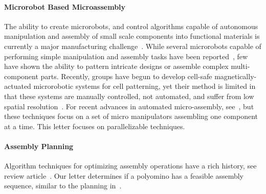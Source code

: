 \paragraph{Microrobot Based Microassembly}
The ability to create microrobots, and control algorithms capable of autonomous manipulation and assembly of small scale components into functional materials is currently a major manufacturing challenge~\cite{chang2005therapeutic}. 
While several microrobots capable of performing simple manipulation and assembly tasks have been reported~\cite{prakash2007artificial,chang2007artificial,weibel2007microfabrication,abbott2007robotics,yi2006microfluidics,castillo2009manipulation}, few have shown the ability to pattern intricate designs or assemble complex multi-component parts. 
Recently, groups have begun to develop cell-safe magnetically-actuated microrobotic systems for cell patterning, yet their method is limited in that these systems are manually controlled, not automated, and suffer from low spatial resolution~\cite{tasoglu2014untethered,tasoglu2014guided}. 
For recent advances in automated micro-assembly, see~\cite{seymour2016automated}, but these techniques focus on a set of micro manipulators assembling one component at a time. This letter focuses on parallelizable techniques.


\paragraph{Assembly Planning}
Algorithm techniques for optimizing assembly operations have a rich history, see review article~\cite{rashid2012review}.
Our letter determines if a polyomino has a feasible assembly sequence, similar to the planning in~\cite{Su2007}.





 

